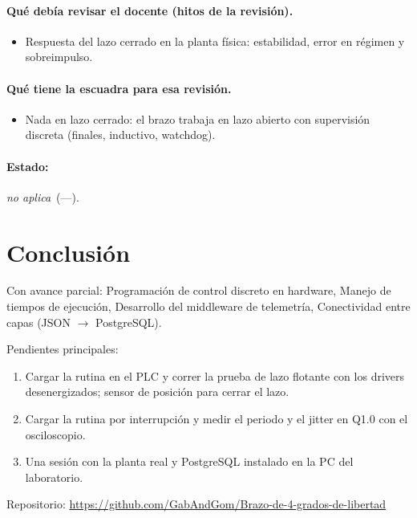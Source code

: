 \documentclass[a4paper,11pt]{article}
\begin{document}
\paragraph{Qué debía revisar el docente (hitos de la revisión).}
\begin{itemize}
\item[$\square$] Respuesta del lazo cerrado en la planta física: estabilidad, error en régimen y sobreimpulso.
\end{itemize}
\paragraph{Qué tiene la escuadra para esa revisión.}
\begin{itemize}
\item Nada en lazo cerrado: el brazo trabaja en lazo abierto con supervisión discreta (finales, inductivo, watchdog).
\end{itemize}
\paragraph{Estado:} \textit{no aplica}~(—).
\section{Conclusión}
Con avance parcial: Programación de control discreto en hardware, Manejo de tiempos de ejecución, Desarrollo del middleware de telemetría, Conectividad entre capas (JSON $\to$ PostgreSQL).
\par\smallskip Pendientes principales:
\begin{enumerate}
\item Cargar la rutina en el PLC y correr la prueba de lazo flotante con los drivers desenergizados; sensor de posición para cerrar el lazo.
\item Cargar la rutina por interrupción y medir el periodo y el jitter en Q1.0 con el osciloscopio.
\item Una sesión con la planta real y PostgreSQL instalado en la PC del laboratorio.
\end{enumerate}
\par\smallskip\noindent Repositorio: \url{https://github.com/GabAndGom/Brazo-de-4-grados-de-libertad}
\end{document}
